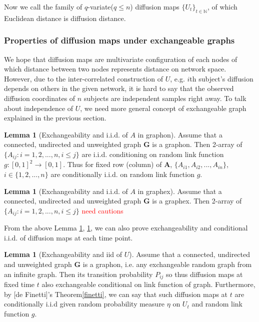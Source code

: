 \documentclass[12pt]{article}
\theoremstyle{definition}
\newtheorem{lemma}[theorem]{Lemma}
\begin{document}
	
	Now we call the family of $q$-variate($q \leq n$) diffusion maps $\{ U_{t} \}_{t \in \mathbb{N}} $, of which Euclidean distance is diffusion distance.
	
	
\subsubsection{Properties of diffusion maps under exchangeable graphs}

We hope that diffusion maps are multivariate configuration of each nodes of which distance between two nodes represents distance on network space. However, due to the inter-correlated construction of $U$, e.g. $i$th subject's diffusion depends on others in the given network, it is hard to say that the observed diffusion coordinates of $n$ subjects are independent samples right away. To talk about independence of $U$, we need more general concept of exchangeable graph explained in the previous section. 
	
\begin{lemma}[Exchangeability and i.i.d. of $A$ in graphon]
	\label{lemma1}
Assume that a connected, undirected and unweighted graph $\mathbf{G}$ is a graphon. Then 2-array of $\{ A_{ij} : i = 1,2,... ,n , i \leq j \}$ are i.i.d. conditioning on random link function $g : [0,1]^2 \rightarrow [0,1]$. Thus for fixed row (column) of $\mathbf{A}$, $\{ A_{i1}, A_{i2}, ... , A_{in} \}$, $i \in \{ 1,2,... , n \}$ are conditionally i.i.d. on random link function $g$.  
\end{lemma}
	
	
	
\begin{lemma}[Exchangeability and i.i.d. of $A$ in graphex]
		\label{lemma2}
		Assume that a connected, undirected and unweighted graph $\mathbf{G}$ is a graphex. Then 2-array of $\{ A_{ij} : i = 1,2,... ,n , i \leq j \}$ \textcolor{red}{need cautions}
\end{lemma}
	
	
	From the above Lemma \ref{lemma1}, \ref{lemma2}, we can also prove exchangeability and conditional i.i.d. of diffusion maps at each time point. 
	
	\begin{lemma}[Exchangeability and iid of $U$]
		\label{lemma3}
		Assume that a connected, undirected and unweighted graph $\mathbf{G}$ is a graphon, i.e. any exchangeable random graph from an infinite graph. Then its transition probability $P_{ij}$ so thus  diffusion maps at fixed time $t$ also exchangeable conditional on link function of graph. Furthermore, by [de Finetti]'s Theorem\ref{finetti}, we can say that such diffusion maps at $t$ are conditionally i.i.d given random probability measure $\eta$ on $U_{t}$ and random link function $g$.    
	\end{lemma}
	
\end{document}
